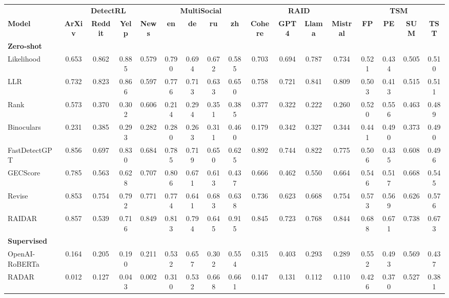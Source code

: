 \begin{tabular}{lcccccccccccccccc}
\toprule
& \multicolumn{4}{c}{\textbf{DetectRL~\citep{wu2024detectrl}}} & \multicolumn{4}{c}{\textbf{MultiSocial~\citep{macko2025multi}}} & \multicolumn{4}{c}{\textbf{RAID~\cite{dugan2024raid}}} & \multicolumn{4}{c}{\textbf{TSM~\citep{quaremba2026tsm}}} \\
\cmidrule(lr){2-5}\cmidrule(lr){6-9}\cmidrule(lr){10-13}\cmidrule(lr){14-17}
\textbf{Model} & \textbf{ArXiv} & \textbf{Reddit} & \textbf{Yelp} & \textbf{News} & \textbf{en} & \textbf{de} & \textbf{ru} & \textbf{zh} & \textbf{Cohere} & \textbf{GPT4} & \textbf{Llama} & \textbf{Mistral} & \textbf{FP} & \textbf{PE} & \textbf{SUM} & \textbf{TST} \\
\midrule
\multicolumn{17}{l}{\textbf{Zero-shot}} \\
\midrule
Likelihood & 0.653 & 0.862 & 0.885 & 0.579 & 0.790 & 0.694 & 0.672 & 0.585 & 0.703 & 0.694 & 0.787 & 0.734 & 0.521 & 0.434 & 0.505 & 0.510 \\
LLR & 0.732 & 0.823 & 0.866 & 0.597 & 0.776 & 0.713 & 0.633 & 0.650 & 0.758 & 0.721 & 0.841 & 0.809 & 0.503 & 0.413 & 0.515 & 0.511 \\
Rank & 0.573 & 0.370 & 0.302 & 0.606 & 0.214 & 0.294 & 0.351 & 0.385 & 0.377 & 0.322 & 0.222 & 0.260 & 0.520 & 0.556 & 0.463 & 0.489 \\
Binoculars & 0.231 & 0.385 & 0.293 & 0.282 & 0.280 & 0.263 & 0.311 & 0.460 & 0.179 & 0.342 & 0.327 & 0.344 & 0.441 & 0.490 & 0.373 & 0.490 \\
FastDetectGPT & 0.856 & 0.697 & 0.830 & 0.684 & 0.785 & 0.719 & 0.650 & 0.625 & 0.892 & 0.744 & 0.822 & 0.775 & 0.506 & 0.435 & 0.608 & 0.496 \\
GECScore & 0.785 & 0.563 & 0.628 & 0.707 & 0.806 & 0.671 & 0.613 & 0.437 & 0.666 & 0.462 & 0.550 & 0.664 & 0.546 & 0.517 & 0.668 & 0.545 \\
Revise & 0.853 & 0.754 & 0.792 & 0.771 & 0.774 & 0.641 & 0.683 & 0.638 & 0.736 & 0.623 & 0.668 & 0.754 & 0.573 & 0.569 & 0.626 & 0.576 \\
RAIDAR & 0.857 & 0.539 & 0.716 & 0.849 & 0.813 & 0.794 & 0.645 & 0.915 & 0.845 & 0.723 & 0.768 & 0.844 & 0.688 & 0.671 & 0.738 & 0.673 \\
\midrule
\multicolumn{17}{l}{\textbf{Supervised}} \\
\midrule
OpenAI-RoBERTa & 0.164 & 0.205 & 0.190 & 0.211 & 0.532 & 0.657 & 0.302 & 0.554 & 0.315 & 0.403 & 0.293 & 0.289 & 0.552 & 0.493 & 0.569 & 0.437 \\
RADAR & 0.012 & 0.127 & 0.043 & 0.002 & 0.310 & 0.532 & 0.668 & 0.661 & 0.147 & 0.131 & 0.112 & 0.110 & 0.426 & 0.370 & 0.527 & 0.381 \\

\end{tabular}
